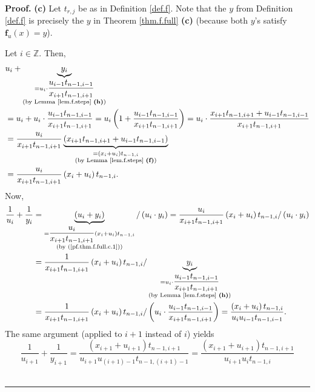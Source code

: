 \documentclass[numbers=enddot,12pt,final,onecolumn,notitlepage]{scrartcl}%
\theoremstyle{definition}
\newenvironment{proof}[1][Proof]{\noindent\textbf{#1.} }{\ \rule{0.5em}{0.5em}}
\begin{document}
\begin{proof}
\textbf{(c)} Let $t_{r,j}$ be as in Definition \ref{def.f}. Note that the $y$
from Definition \ref{def.f} is precisely the $y$ in Theorem \ref{thm.f.full}
\textbf{(c)} (because both $y$'s satisfy $\mathbf{f}_{u}\left(  x\right)  =y$).

Let $i\in\mathbb{Z}$. Then,%
\begin{align}
&  u_{i}+\underbrace{y_{i}}_{\substack{=u_{i}\cdot\dfrac{u_{i-1}t_{n-1,i-1}%
}{x_{i+1}t_{n-1,i+1}}\\\text{(by Lemma \ref{lem.f.steps} \textbf{(h)})}%
}}\nonumber\\
&  =u_{i}+u_{i}\cdot\dfrac{u_{i-1}t_{n-1,i-1}}{x_{i+1}t_{n-1,i+1}}%
=u_{i}\left(  1+\dfrac{u_{i-1}t_{n-1,i-1}}{x_{i+1}t_{n-1,i+1}}\right)
=u_{i}\cdot\dfrac{x_{i+1}t_{n-1,i+1}+u_{i-1}t_{n-1,i-1}}{x_{i+1}t_{n-1,i+1}%
}\nonumber\\
&  =\dfrac{u_{i}}{x_{i+1}t_{n-1,i+1}}\underbrace{\left(  x_{i+1}%
t_{n-1,i+1}+u_{i-1}t_{n-1,i-1}\right)  }_{\substack{=\left(  x_{i}%
+u_{i}\right)  t_{n-1,i}\\\text{(by Lemma \ref{lem.f.steps} \textbf{(f)})}%
}}\nonumber\\
&  =\dfrac{u_{i}}{x_{i+1}t_{n-1,i+1}}\left(  x_{i}+u_{i}\right)  t_{n-1,i}.
\label{pf.thm.f.full.c.1}%
\end{align}
Now,%
\begin{align*}
\dfrac{1}{u_{i}}+\dfrac{1}{y_{i}}  &  =\underbrace{\left(  u_{i}+y_{i}\right)
}_{\substack{=\dfrac{u_{i}}{x_{i+1}t_{n-1,i+1}}\left(  x_{i}+u_{i}\right)
t_{n-1,i}\\\text{(by (\ref{pf.thm.f.full.c.1}))}}}/\left(  u_{i}\cdot
y_{i}\right)  =\dfrac{u_{i}}{x_{i+1}t_{n-1,i+1}}\left(  x_{i}+u_{i}\right)
t_{n-1,i}/\left(  u_{i}\cdot y_{i}\right) \\
&  =\dfrac{1}{x_{i+1}t_{n-1,i+1}}\left(  x_{i}+u_{i}\right)  t_{n-1,i}%
/\underbrace{y_{i}}_{\substack{=u_{i}\cdot\dfrac{u_{i-1}t_{n-1,i-1}}%
{x_{i+1}t_{n-1,i+1}}\\\text{(by Lemma \ref{lem.f.steps} \textbf{(h)})}}}\\
&  =\dfrac{1}{x_{i+1}t_{n-1,i+1}}\left(  x_{i}+u_{i}\right)  t_{n-1,i}/\left(
u_{i}\cdot\dfrac{u_{i-1}t_{n-1,i-1}}{x_{i+1}t_{n-1,i+1}}\right)
=\dfrac{\left(  x_{i}+u_{i}\right)  t_{n-1,i}}{u_{i}u_{i-1}t_{n-1,i-1}}.
\end{align*}
The same argument (applied to $i+1$ instead of $i$) yields%
\[
\dfrac{1}{u_{i+1}}+\dfrac{1}{y_{i+1}}=\dfrac{\left(  x_{i+1}+u_{i+1}\right)
t_{n-1,i+1}}{u_{i+1}u_{\left(  i+1\right)  -1}t_{n-1,\left(  i+1\right)  -1}%
}=\dfrac{\left(  x_{i+1}+u_{i+1}\right)  t_{n-1,i+1}}{u_{i+1}u_{i}t_{n-1,i}}%
\]
\end{proof}
\end{document}
